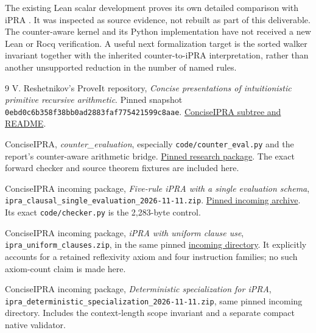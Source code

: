 \documentclass[10pt,letterpaper]{article}
\theoremstyle{definition}
\theoremstyle{remark}
\begin{document}
The existing Lean scalar development proves its own detailed comparison
with iPRA \cite{lean}. It was inspected as source evidence, not rebuilt
as part of this deliverable. The counter-aware kernel and its Python
implementation have not received a new Lean or Rocq verification. A
useful next formalization target is the sorted walker invariant together
with the inherited counter-to-iPRA interpretation, rather than another
unsupported reduction in the number of named rules.

\begin{thebibliography}{9}
V. Reshetnikov's ProveIt repository,
\emph{Concise presentations of intuitionistic primitive recursive arithmetic}.
Pinned snapshot
\texttt{0ebd0c6b358f38bb0ad2883faf775421599c8aae}.
\href{https://github.com/VladimirReshetnikov/ProveIt/tree/0ebd0c6b358f38bb0ad2883faf775421599c8aae/Logic/PrimitiveRecursiveArithmetic/ConciseIPRA}{ConciseIPRA subtree and README}.

ConciseIPRA, \emph{counter\_evaluation}, especially
\texttt{code/counter\_eval.py} and the report's counter-aware arithmetic bridge.
\href{https://github.com/VladimirReshetnikov/ProveIt/tree/0ebd0c6b358f38bb0ad2883faf775421599c8aae/Logic/PrimitiveRecursiveArithmetic/ConciseIPRA/Research/counter_evaluation}{Pinned research package}.
The exact forward checker and source theorem fixtures are included here.

ConciseIPRA incoming package,
\emph{Five-rule iPRA with a single evaluation schema},
\texttt{ipra\_clausal\_single\_evaluation\_2026-11-11.zip}.
\href{https://github.com/VladimirReshetnikov/ProveIt/blob/0ebd0c6b358f38bb0ad2883faf775421599c8aae/Logic/PrimitiveRecursiveArithmetic/ConciseIPRA/docs/incoming/ipra_clausal_single_evaluation_2026-11-11.zip}{Pinned incoming archive}.
Its exact \texttt{code/checker.py} is the 2,283-byte control.

ConciseIPRA incoming package,
\emph{iPRA with uniform clause use},
\texttt{ipra\_uniform\_clauses.zip}, in the same pinned
\href{https://github.com/VladimirReshetnikov/ProveIt/tree/0ebd0c6b358f38bb0ad2883faf775421599c8aae/Logic/PrimitiveRecursiveArithmetic/ConciseIPRA/docs/incoming}{incoming directory}.
It explicitly accounts for a retained reflexivity axiom and four
instruction families; no such axiom-count claim is made here.

ConciseIPRA incoming package,
\emph{Deterministic specialization for iPRA},
\texttt{ipra\_deterministic\_specialization\_2026-11-11.zip},
same pinned incoming directory. Includes the context-length scope
invariant and a separate compact native validator.


\end{thebibliography}
\end{document}
